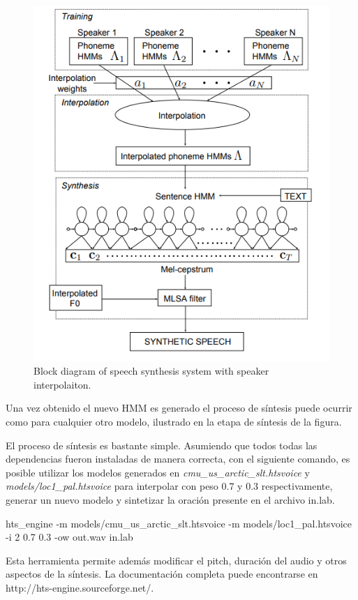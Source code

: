 \begin{figure}
\begin{center}
\includegraphics[scale=0.4]{imagenes/speakerInterpolation.png}
\caption{Block diagram of speech synthesis system with speaker interpolaiton. }
\label{spekerInterpolationImagen}
\end{center}
\end{figure}

Una vez obtenido el nuevo HMM es generado el proceso de síntesis puede ocurrir como para cualquier otro modelo, ilustrado en la etapa de síntesis de la figura.

El proceso de síntesis es bastante simple. Asumiendo que todos todas las dependencias fueron instaladas de manera correcta, con el siguiente comando, es posible utilizar los modelos generados en \textit{cmu\_us\_arctic\_slt.htsvoice} y \textit{models/loc1\_pal.htsvoice} para interpolar con peso $0.7$ y $0.3$ respectivamente, generar un nuevo modelo y sintetizar la oración presente en el archivo in.lab.

\begin{tcolorbox}
hts\_engine -m models/cmu\_us\_arctic\_slt.htsvoice -m models/loc1\_pal.htsvoice -i 2 0.7 0.3 -ow out.wav in.lab
\end{tcolorbox}

Esta herramienta permite además modificar el pitch, duración del audio y otros aspectos de la síntesis. La documentación completa puede encontrarse en http://hts-engine.sourceforge.net/.